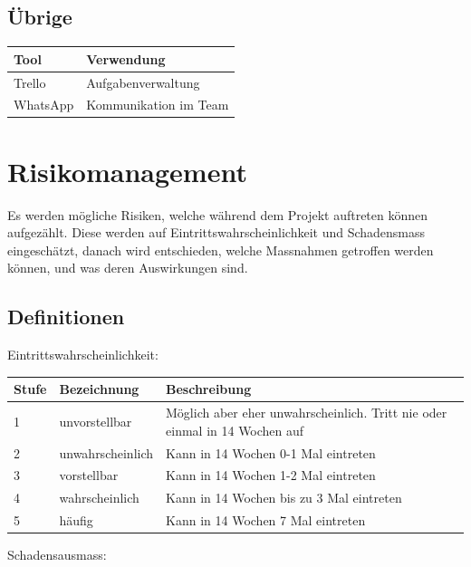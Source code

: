 \documentclass[a4paper]{scrreprt}
\begin{document}
\subsection{Übrige}
\begin{table}[h!]
	\begin{tabular}{p{} p{}}
		\hline
		\textbf{Tool} & \textbf{Verwendung} \\
		\hline
		Trello & Aufgabenverwaltung \\
		\hline
		WhatsApp & Kommunikation im Team \\
		\hline
	\end{tabular}
\end{table}

\section{Risikomanagement}

Es werden mögliche Risiken, welche während dem Projekt auftreten können aufgezählt. Diese werden auf Eintrittswahrscheinlichkeit und Schadensmass eingeschätzt, danach wird entschieden, welche Massnahmen getroffen werden können, und was deren Auswirkungen sind.

\subsection{Definitionen}
\label{sssec:Def}
\vspace{1em}
\noindent
Eintrittswahrscheinlichkeit:

\vspace{1em}
\noindent
\begin{tabularx}{\textwidth}{|l|l|X|}
	\hline
	\textbf{Stufe} & \textbf{Bezeichnung} & \textbf{Beschreibung} \\
	\hline
	1 & unvorstellbar & Möglich aber eher unwahrscheinlich. Tritt nie oder einmal in 14 Wochen auf \\
	\hline
	2 & unwahrscheinlich & Kann in 14 Wochen 0-1 Mal eintreten\\
	\hline
	3 & vorstellbar & Kann in 14 Wochen 1-2 Mal eintreten \\
	\hline
	4 & wahrscheinlich & Kann in 14 Wochen bis zu 3 Mal eintreten \\
	\hline
	5 & häufig & Kann in 14 Wochen 7 Mal eintreten\\
	\hline
\end{tabularx}

\vspace{1em}
\noindent
Schadensausmass:
\end{document}
